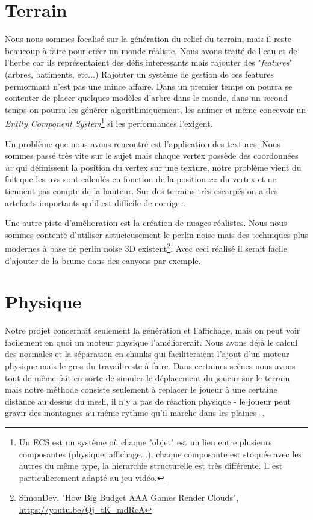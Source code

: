 \documentclass{EPUProjetDi}
\begin{document}
\section{Terrain}

Nous nous sommes focalisé sur la génération du relief du terrain, mais il reste beaucoup à faire pour créer un monde réaliste. Nous avons traité de l'eau et de l'herbe car ils représentaient des défis interessants mais rajouter des "\textit{features}" (arbres, batiments, etc...) Rajouter un système de gestion de ces features permormant n'est pas une mince affaire. Dans un premier temps on pourra se contenter de placer quelques modèles d'arbre dans le monde, dans un second temps on pourra les générer algorithmiquement, les animer et même concevoir un \textit{Entity Component System}\footnote{Un ECS est un système où chaque "objet" est un lien entre plusieurs composantes (physique, affichage...), chaque composante est stoquée avec les autres du même type, la hierarchie structurelle est très différente. Il est particulierement adapté au jeu vidéo.} si les performances l'exigent.

\par
Un problème que nous avons rencontré est l'application des textures. Nous sommes passé très vite sur le sujet mais chaque vertex possède des coordonnées \textit{uv} qui définissent la position du vertex sur une texture, notre problème vient du fait que les uvs sont calculés en fonction de la position $xz$ du vertex et ne tiennent pas compte de la hauteur. Sur des terrains très escarpés on a des artefacts importants qu'il est difficile de corriger.

\par
Une autre piste d'amélioration est la création de nuages réalistes. Nous nous sommes contenté d'utiliser astucieusement le perlin noise mais des techniques plus modernes à base de perlin noise 3D existent\footnote{SimonDev, "How Big Budget AAA Games Render Clouds", \url{https://youtu.be/Qj_tK_mdRcA}}. Avec ceci réalisé il serait facile d'ajouter de la brume dans des canyons par exemple.

\section{Physique}

Notre projet concernait seulement la génération et l'affichage, mais on peut voir facilement en quoi un moteur physique l'améliorerait. Nous avons déjà le calcul des normales et la séparation en chunks qui faciliteraient l'ajout d'un moteur physique mais le gros du travail reste à faire. Dans certaines scènes nous avons tout de même fait en sorte de simuler le déplacement du joueur sur le terrain mais notre méthode consiste seulement à replacer le joueur à une certaine distance au dessus du mesh, il n'y a pas de réaction physique - le joueur peut gravir des montagnes au même rythme qu'il marche dans les plaines -.
\end{document}
